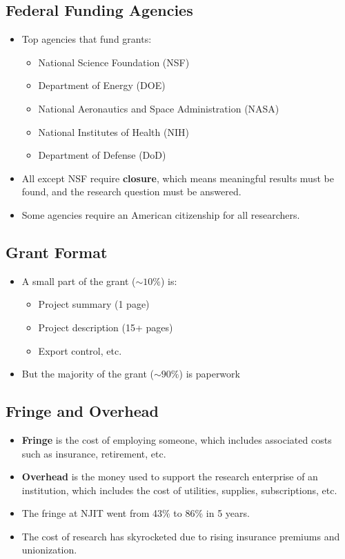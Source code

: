 \subsection{Federal Funding Agencies}

\begin{itemize}
    \item Top agencies that fund grants:
          \begin{itemize}
              \item National Science Foundation (NSF)
              \item Department of Energy (DOE)
              \item National Aeronautics and Space Administration (NASA)
              \item National Institutes of Health (NIH)
              \item Department of Defense (DoD)
          \end{itemize}
    \item All except NSF require \textbf{closure}, which means meaningful results must be found, and the research question must be answered.
    \item Some agencies require an American citizenship for all researchers.
\end{itemize}

\subsection{Grant Format}
\begin{itemize}
    \item A small part of the grant ($\sim 10\%$) is:
          \begin{itemize}
              \item Project summary (1 page)
              \item Project description (15+ pages)
              \item Export control, etc.
          \end{itemize}
    \item But the majority of the grant ($\sim 90\%$) is paperwork
\end{itemize}

\subsection{Fringe and Overhead}
\begin{itemize}
    \item \textbf{Fringe} is the cost of employing someone, which includes associated costs such as insurance, retirement, etc.
    \item \textbf{Overhead} is the money used to support the research enterprise of an institution, which includes the cost of utilities, supplies, subscriptions, etc.
    \item The fringe at NJIT went from 43\% to 86\% in 5 years.
    \item The cost of research has skyrocketed due to rising insurance premiums and unionization.
\end{itemize}